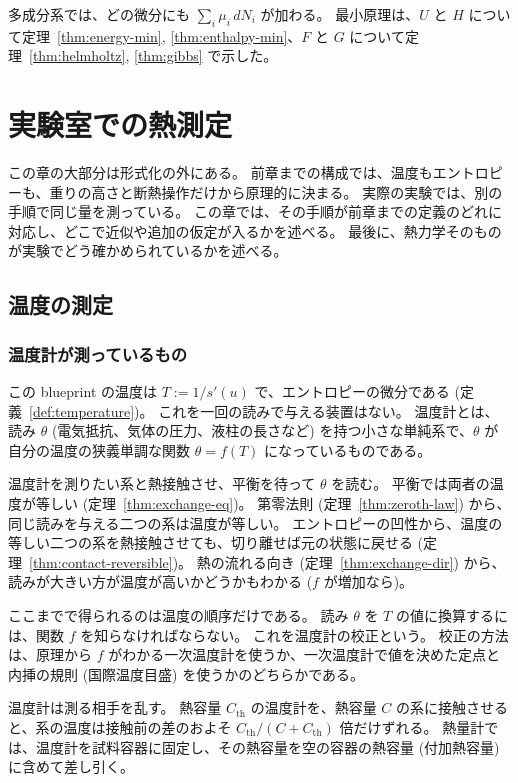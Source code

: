 多成分系では、どの微分にも $\sum_i \mu_i\, dN_i$ が加わる。
最小原理は、$U$ と $H$ について定理~\ref{thm:energy-min}, \ref{thm:enthalpy-min}、$F$ と $G$ について定理~\ref{thm:helmholtz}, \ref{thm:gibbs} で示した。

\chapter{実験室での熱測定}
\label{chap:calorimetry}

この章の大部分は形式化の外にある。
前章までの構成では、温度もエントロピーも、重りの高さと断熱操作だけから原理的に決まる。
実際の実験では、別の手順で同じ量を測っている。
この章では、その手順が前章までの定義のどれに対応し、どこで近似や追加の仮定が入るかを述べる。
最後に、熱力学そのものが実験でどう確かめられているかを述べる。

\section{温度の測定}
\label{sec:thermometry}

\subsection{温度計が測っているもの}

この blueprint の温度は $T := 1/s'(u)$ で、エントロピーの微分である (定義~\ref{def:temperature})。
これを一回の読みで与える装置はない。
温度計とは、読み $\theta$ (電気抵抗、気体の圧力、液柱の長さなど) を持つ小さな単純系で、$\theta$ が自分の温度の狭義単調な関数 $\theta = f(T)$ になっているものである。

温度計を測りたい系と熱接触させ、平衡を待って $\theta$ を読む。
平衡では両者の温度が等しい (定理~\ref{thm:exchange-eq})。
第零法則 (定理~\ref{thm:zeroth-law}) から、同じ読みを与える二つの系は温度が等しい。
エントロピーの凹性から、温度の等しい二つの系を熱接触させても、切り離せば元の状態に戻せる (定理~\ref{thm:contact-reversible})。
熱の流れる向き (定理~\ref{thm:exchange-dir}) から、読みが大きい方が温度が高いかどうかもわかる ($f$ が増加なら)。

ここまでで得られるのは温度の順序だけである。
読み $\theta$ を $T$ の値に換算するには、関数 $f$ を知らなければならない。
これを温度計の校正という。
校正の方法は、原理から $f$ がわかる一次温度計を使うか、一次温度計で値を決めた定点と内挿の規則 (国際温度目盛) を使うかのどちらかである。

温度計は測る相手を乱す。
熱容量 $C_{\mathrm{th}}$ の温度計を、熱容量 $C$ の系に接触させると、系の温度は接触前の差のおよそ $C_{\mathrm{th}}/(C + C_{\mathrm{th}})$ 倍だけずれる。
熱量計では、温度計を試料容器に固定し、その熱容量を空の容器の熱容量 (付加熱容量) に含めて差し引く。

